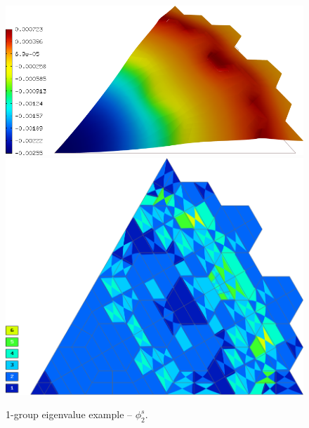 \begin{figure}[!ht]
\centering
  \includegraphics[scale=.25]{hex/f2.png}
	\hspace{.5em}
  \includegraphics[scale=.19]{hex/mesh_f2.png}
	\caption[Solution of the 1-group eigenvalue example]{1-group eigenvalue example -- $\phi_2^s$.}
	\label{fig:52}
\end{figure}
